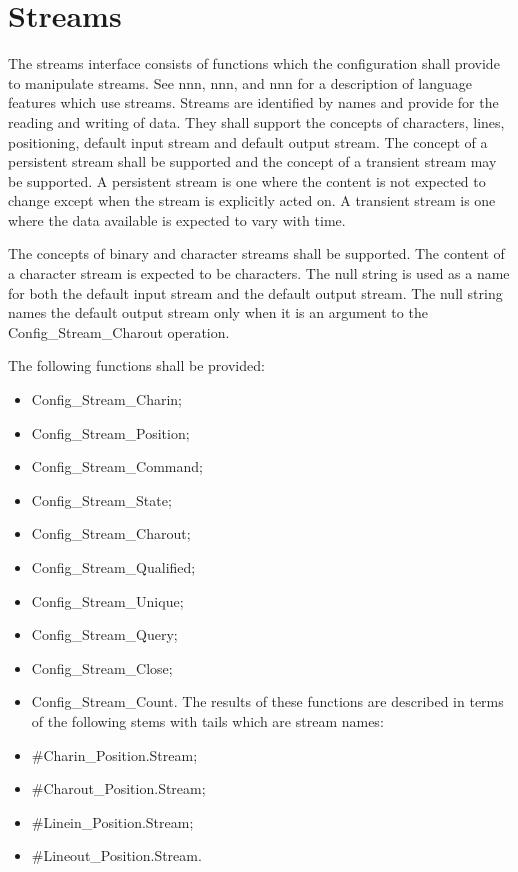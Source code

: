 \hypertarget{streams}{%
\section{Streams}\label{streams}}

The streams interface consists of functions which the configuration
shall provide to manipulate streams. See nnn, nnn, and nnn for a
description of language features which use streams. Streams are
identified by names and provide for the reading and writing of data.
They shall support the concepts of characters, lines, positioning,
default input stream and default output stream. The concept of a
persistent stream shall be supported and the concept of a transient
stream may be supported. A persistent stream is one where the content is
not expected to change except when the stream is explicitly acted on. A
transient stream is one where the data available is expected to vary
with time.

The concepts of binary and character streams shall be supported. The
content of a character stream is expected to be characters. The null
string is used as a name for both the default input stream and the
default output stream. The null string names the default output stream
only when it is an argument to the Config\_Stream\_Charout operation.

The following functions shall be provided:

\begin{itemize}
\item
  Config\_Stream\_Charin;
\item
  Config\_Stream\_Position;
\item
  Config\_Stream\_Command;
\item
  Config\_Stream\_State;
\item
  Config\_Stream\_Charout;
\item
  Config\_Stream\_Qualified;
\item
  Config\_Stream\_Unique;
\item
  Config\_Stream\_Query;
\item
  Config\_Stream\_Close;
\item
  Config\_Stream\_Count. The results of these functions are described in
  terms of the following stems with tails which are stream names:
\item
  \#Charin\_Position.Stream;
\item
  \#Charout\_Position.Stream;
\item
  \#Linein\_Position.Stream;
\item
  \#Lineout\_Position.Stream.
\end{itemize}

